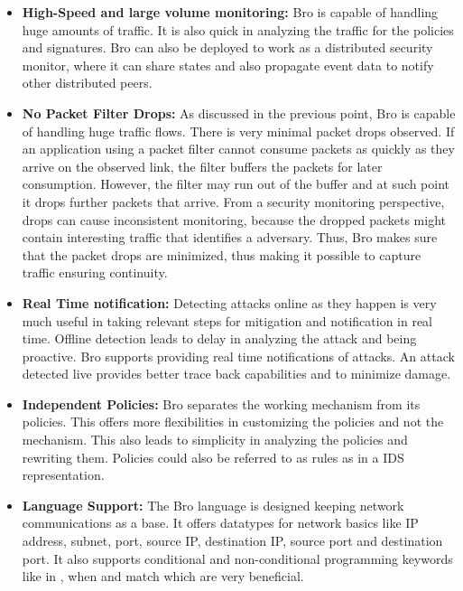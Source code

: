 \documentclass[article,msc=informatik,type=msc,colorback,accentcolor=tud9c]{tudthesis}
\begin{document}
		\begin{itemize}
		
		\item\textbf{High-Speed and large volume monitoring:} Bro is capable of handling huge amounts of traffic. It is also quick in analyzing the traffic for the policies and signatures. Bro can also be deployed to work as a distributed
		security monitor, where it can share states and also propagate event data to notify other distributed peers.
	
		\item\textbf{No Packet Filter Drops:} As discussed in the previous point, Bro is capable of handling huge traffic flows. There is very minimal packet drops observed.
		If an application using a packet filter cannot consume packets as quickly as they arrive on the observed link, the filter buffers the packets for later consumption.
		However, the filter may run out of the buffer and at such point it drops further packets that arrive. From a security monitoring perspective, drops can cause inconsistent monitoring, 
		because the dropped packets might contain interesting traffic that identifies a adversary. Thus, Bro makes sure that the packet drops are minimized, thus making it possible to capture traffic ensuring continuity.
		
		\item\textbf{Real Time notification:}
		Detecting attacks online as they happen is very much useful in taking relevant steps for mitigation and notification in real time. Offline detection leads to delay in analyzing the attack and being proactive.
		Bro supports providing real time notifications of attacks. An attack detected live provides better trace back capabilities and to minimize damage.   
		
		\item\textbf{Independent Policies:}
		Bro separates the working mechanism from its policies. This offers more flexibilities in customizing the policies and not the mechanism. This also leads to simplicity in analyzing the policies and rewriting them. Policies could also be referred to as rules as in a IDS representation.
		
			
		\item\textbf{Language Support:}
		The Bro language is designed keeping network communications as a base. It offers datatypes for network basics like \ac{IP} address, subnet, port, source \ac{IP}, destination \ac{IP}, source port and destination port. It also supports conditional and non-conditional programming keywords like in , when and match which are very beneficial.
	

\end{itemize}
\end{document}
